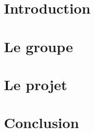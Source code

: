\documentclass[titlepage, 14px, a4paper]{report}
\begin{document}
\AddToShipoutPicture*{\BackgroundPic}

\maketitle
\tableofcontents


\newpage
{}
\part{Introduction}
    
    \newpage 

\part{Le groupe}
    
    \newpage 

\part{Le projet}
    
    \newpage 

\part{Conclusion}
    
    \newpage 

%    
\end{document}
